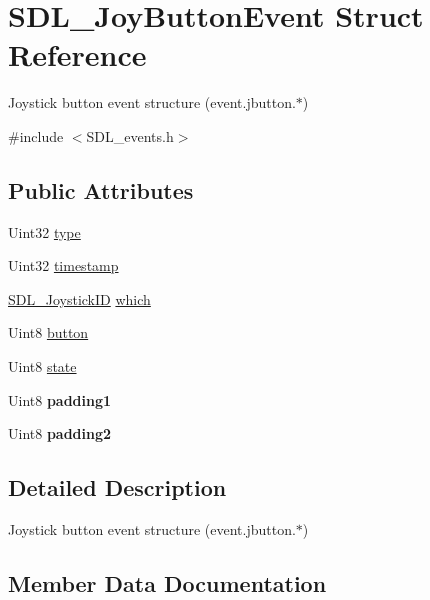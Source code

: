 \hypertarget{structSDL__JoyButtonEvent}{}\section{S\+D\+L\+\_\+\+Joy\+Button\+Event Struct Reference}
\label{structSDL__JoyButtonEvent}


Joystick button event structure (event.\+jbutton.$\ast$)  




{\ttfamily \#include $<$S\+D\+L\+\_\+events.\+h$>$}

\subsection*{Public Attributes}
\begin{DoxyCompactItemize}
\item 
Uint32 \hyperlink{structSDL__JoyButtonEvent_a8f3312a046d37fa2884b93f69c4cb655}{type}
\item 
Uint32 \hyperlink{structSDL__JoyButtonEvent_ab50b6f7d1ab3ac53df69fc2d6cf5fa2a}{timestamp}
\item 
\hyperlink{SDL__joystick_8h_a3c3d32500cb08f76ee8077983912c0bd}{S\+D\+L\+\_\+\+Joystick\+ID} \hyperlink{structSDL__JoyButtonEvent_a1679049adad7242b28420948fdc79044}{which}
\item 
Uint8 \hyperlink{structSDL__JoyButtonEvent_a73ebe4261cf80564052af9c1af737a4d}{button}
\item 
Uint8 \hyperlink{structSDL__JoyButtonEvent_ad3b6f8d9aa2c5e694f664b97d12bcd2b}{state}
\item 
\mbox{\label{structSDL__JoyButtonEvent_a3e7ca473fb7783d755d64598529b1ff9}} 
Uint8 {\bfseries padding1}
\item 
\mbox{\label{structSDL__JoyButtonEvent_a77a78bee38f4bf0682ccd97bbf8f9ab9}} 
Uint8 {\bfseries padding2}
\end{DoxyCompactItemize}


\subsection{Detailed Description}
Joystick button event structure (event.\+jbutton.$\ast$) 

\subsection{Member Data Documentation}
\mbox{\label{structSDL__JoyButtonEvent_a73ebe4261cf80564052af9c1af737a4d}} 
